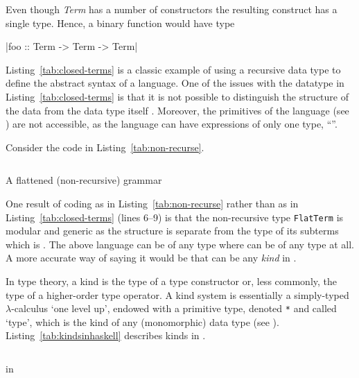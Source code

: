 \documentclass[thesis-solanki.tex]{subfiles}
\begin{document}
Even though \textit{Term} has a number of constructors the resulting construct has a single type.
Hence, a binary function would have type
\par
{}|foo :: Term -> Term -> Term|

Listing~\ref{tab:closed-terms} is a classic example of using a recursive data type to define the
abstract syntax of a language.
One of the issues with the datatype in Listing~\ref{tab:closed-terms} is that it is not possible to distinguish the
structure of the data from the data type itself \cite{sheard2004two}.
Moreover, the primitives of the language (see \cite{website:understandingalgebrasfpcomplete}) are not accessible,
as the language can have expressions of only one type, ``''.

Consider the code in Listing~\ref{tab:non-recurse}.
\begin{code-list}[H]
\begin{singlespace}
\inputminted{haskell}{haskell-proto1-non-recurse.hs}
\end{singlespace}
  \caption{A flattened (non-recursive) grammar}
  \label{tab:non-recurse}
\end{code-list}

One result of coding as in Listing~\ref{tab:non-recurse} rather than as in Listing~\ref{tab:closed-terms} (lines
6--9) is that the non-recursive type \texttt{FlatTerm} is modular and generic as the structure
 is separate from the type of its subterms which is .
The above language can be of any type   where  can be of any
type at all.
A more accurate way of saying it would be that  can be any \textit{kind} in .

In type theory, a kind is the type of a type constructor or, less commonly, the type of a higher-order type
operator.
A kind system is essentially a simply-typed \(\lambda\)-calculus `one level up', endowed with a primitive type,
denoted \Verb!*!
and called `type', which is the kind of any (monomorphic) data type (see \cite{website:kindhaskellwiki}).
Listing~\ref{tab:kindsinhaskell} describes kinds in .

\begin{code-list}[H]
\begin{singlespace}
\inputminted{haskell}{haskell-proto1-kinds-in-haskell.hs}
\end{singlespace}
\caption{ in }
\label{tab:kindsinhaskell}
\end{code-list}
\end{document}
